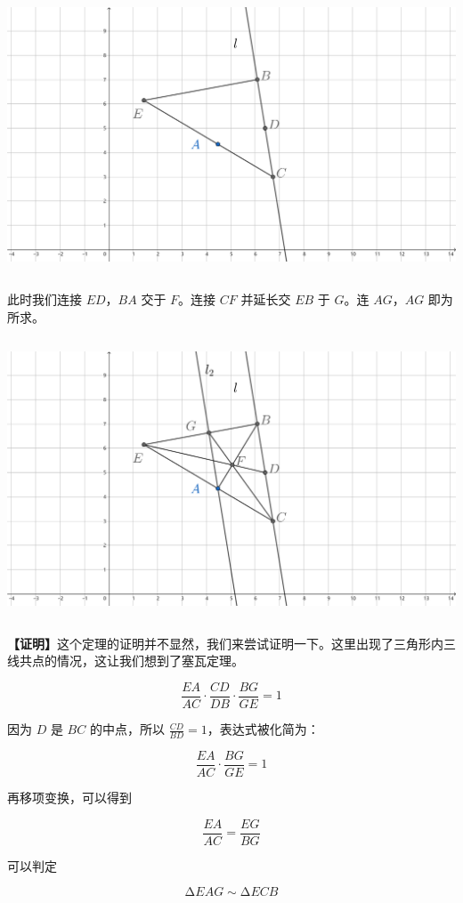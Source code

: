 \documentclass[UTF8]{article}
\begin{document}
\includegraphics[width=5.76806in,height=3.27847in]{media/image12.png}

此时我们连接 \(ED\)，\(BA\) 交于 \(F\)。连接 \(CF\) 并延长交 \(EB\) 于
\(G\)。连 \(AG\)，\(AG\) 即为所求。

\includegraphics[width=5.76806in,height=3.27847in]{media/image13.png}

\textbf{【证明】}这个定理的证明并不显然，我们来尝试证明一下。这里出现了三角形内三线共点的情况，这让我们想到了塞瓦定理。

\[\frac{EA}{AC} \cdot \frac{CD}{DB} \cdot \frac{BG}{GE} = 1\]

因为 \(D\) 是 \(BC\) 的中点，所以
\(\frac{CD}{BD} = 1\)，表达式被化简为：

\[\frac{EA}{AC} \cdot \frac{BG}{GE} = 1\]

再移项变换，可以得到

\[\frac{EA}{AC} = \frac{EG}{BG}\]

可以判定

\[\mathrm{\Delta}EAG \sim \mathrm{\Delta}ECB\]
\end{document}
